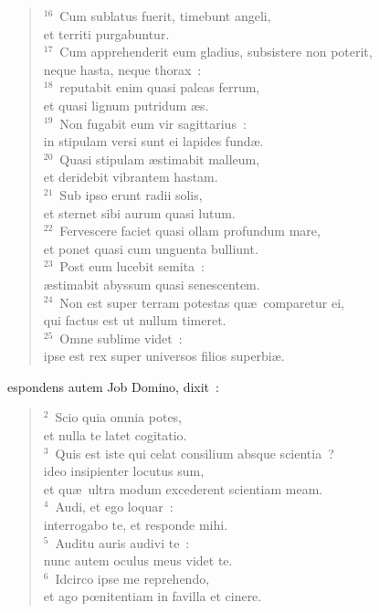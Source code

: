 \begin{flushleft}
\begin{verse}
${}^{16}$~Cum sublatus fuerit, timebunt angeli,\\ et territi purgabuntur.\\
${}^{17}$~Cum apprehenderit eum gladius, subsistere non poterit,\\ neque hasta, neque thorax~:\\
${}^{18}$~reputabit enim quasi paleas ferrum,\\ et quasi lignum putridum \ae s.\\
${}^{19}$~Non fugabit eum vir sagittarius~:\\ in stipulam versi sunt ei lapides fund\ae .\\
${}^{20}$~Quasi stipulam \ae stimabit malleum,\\ et deridebit vibrantem hastam.\\
${}^{21}$~Sub ipso erunt radii solis,\\ et sternet sibi aurum quasi lutum.\\
${}^{22}$~Fervescere faciet quasi ollam profundum mare,\\ et ponet quasi cum unguenta bulliunt.\\
${}^{23}$~Post eum lucebit semita~:\\ \ae stimabit abyssum quasi senescentem.\\
${}^{24}$~Non est super terram potestas qu\ae\ comparetur ei,\\ qui factus est ut nullum timeret.\\
${}^{25}$~Omne sublime videt~:\\ ipse est rex super universos filios superbi\ae .\end{verse}\end{flushleft}



\bchapter
{}espondens autem Job Domino, dixit~:
\begin{flushleft}\begin{verse}\vspace{6pt}${}^{2}$~Scio quia omnia potes,\\ et nulla te latet cogitatio.\\
${}^{3}$~Quis est iste qui celat consilium absque scientia~?\\ ideo insipienter locutus sum,\\ et qu\ae\ ultra modum excederent scientiam meam.\\
${}^{4}$~Audi, et ego loquar~:\\ interrogabo te, et responde mihi.\\
${}^{5}$~Auditu auris audivi te~:\\ nunc autem oculus meus videt te.\\
${}^{6}$~Idcirco ipse me reprehendo,\\ et ago pœnitentiam in favilla et cinere.\end{verse}\end{flushleft}


